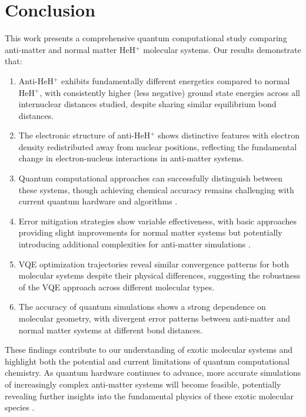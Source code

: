 \documentclass[10pt,twocolumn,a4paper]{article}
\begin{document}
\section{Conclusion}
This work presents a comprehensive quantum computational study comparing anti-matter and normal matter HeH$^+$ molecular systems. Our results demonstrate that:

\begin{enumerate}
    \item Anti-HeH$^+$ exhibits fundamentally different energetics compared to normal HeH$^+$, with consistently higher (less negative) ground state energies across all internuclear distances studied, despite sharing similar equilibrium bond distances.
    
    \item The electronic structure of anti-HeH$^+$ shows distinctive features with electron density redistributed away from nuclear positions, reflecting the fundamental change in electron-nucleus interactions in anti-matter systems.
    
    \item Quantum computational approaches can successfully distinguish between these systems, though achieving chemical accuracy remains challenging with current quantum hardware and algorithms \cite{kandala2017hardware}.
    
    \item Error mitigation strategies show variable effectiveness, with basic approaches providing slight improvements for normal matter systems but potentially introducing additional complexities for anti-matter simulations \cite{sharma2020noise}.
    
    \item VQE optimization trajectories reveal similar convergence patterns for both molecular systems despite their physical differences, suggesting the robustness of the VQE approach across different molecular types.
    
    \item The accuracy of quantum simulations shows a strong dependence on molecular geometry, with divergent error patterns between anti-matter and normal matter systems at different bond distances.
\end{enumerate}

These findings contribute to our understanding of exotic molecular systems and highlight both the potential and current limitations of quantum computational chemistry. As quantum hardware continues to advance, more accurate simulations of increasingly complex anti-matter systems will become feasible, potentially revealing further insights into the fundamental physics of these exotic molecular species \cite{georgescu2014quantum}.
\end{document}
